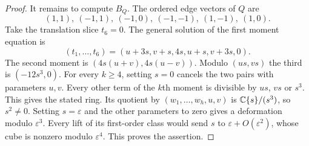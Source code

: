 \begin{proof}
It remains to compute $B_Q$. The ordered edge vectors of $Q$ are
\[
 (1,1),\ (-1,1),\ (-1,0),\ (-1,-1),\ (1,-1),\ (1,0).
\]
Take the translation slice $t_6=0$. The general solution of the
first moment equation is
\[
 (t_1,\ldots,t_6)=(u+3s,v+s,4s,u+s,v+3s,0).
\]
The second moment is $(4s(u+v),4s(u-v))$. Modulo $(us,vs)$
the third is $(-12s^3,0)$. For every $k\geq 4$, setting $s=0$
cancels the two pairs with parameters $u,v$. Every other term of
the $k$th moment is divisible by $us$, $vs$ or $s^3$. This gives
the stated ring. Its quotient by $(w_1,\ldots,w_h,u,v)$ is
$\mathbb C\{s\}/(s^3)$, so $s^2\ne0$. Setting $s=\varepsilon$ and the
other parameters to zero gives a deformation modulo $\varepsilon^3$.
Every lift of its first-order class would send $s$ to
$\varepsilon+O(\varepsilon^2)$, whose cube is nonzero modulo
$\varepsilon^4$. This proves the assertion.
\end{proof}
